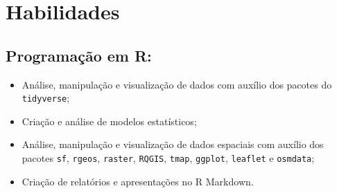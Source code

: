 \documentclass[12pt, a4paper]{article}
\begin{document}





\section{Habilidades}

\subsection{Programação em R:}

\begin{itemize}
   \item Análise, manipulação e visualização de dados com auxílio dos pacotes do \verb|tidyverse|;
   \item Criação e análise de modelos estatísticos;
   \item Análise, manipulação e visualização de dados espaciais com auxílio dos pacotes \verb|sf|, \verb|rgeos|, \verb|raster|, \verb|RQGIS|, \verb|tmap|, \verb|ggplot|, \verb|leaflet| e \verb|osmdata|;
   \item Criação de relatórios e apresentações no R Markdown. 
\end{itemize}
\end{document}
